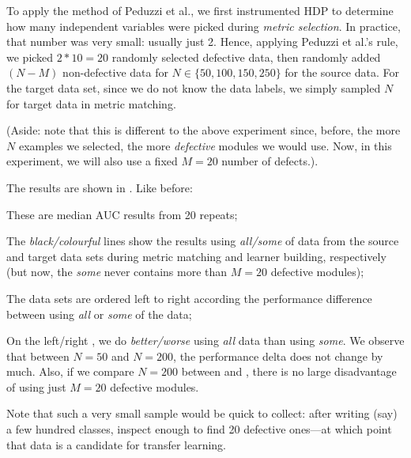   To apply the method of Peduzzi et al., we first instrumented HDP to determine how many
  independent variables were picked during {\em metric  selection}. In practice, that number
  was very small: usually just 2. Hence, applying  Peduzzi et al.'s rule, we picked $2*10=20$ 
  randomly selected defective data, then randomly added $(N-M)$ non-defective data for
  $N\in \{50,100,150,250\}$ for the source data. For the target data set, since we do not
  know the data labels, we simply sampled $N$ for target data in metric matching.

  (Aside: note that this is different to the above experiment since, before, the more $N$ examples
  we selected, the more {\em defective} modules we would use. Now, in this experiment, we will also
  use a fixed $M=20$ number of defects.).

  The results are shown in . Like before:
  \bi
  \item These are median AUC results from 20 repeats;
\item
  The {\em black/colourful} lines show the results using {\em all/some} of  data from
  the source and target data sets during metric matching and learner building, respectively
  (but now, the {\em some} never contains more than $M=20$ defective modules);
\item
  The data sets are ordered left to right according
  the performance difference between using
   {\em all} or {\em some} of the data;
   \item
     On the left/right ,  we do {\em better/worse} using
  {\em all} data than using {\em some}.
  \ei
  We observe that between $N=50$ and $N=200$, the performance delta
  does not change by much. Also, if we compare $N=200$ between 
  and , there is no large disadvantage of using just
  $M=20$ defective modules.

  Note that such a very small sample would be quick to collect: after writing (say) a few
  hundred classes, inspect enough to find 20 defective ones---at which point that data is a candidate
  for transfer learning.
